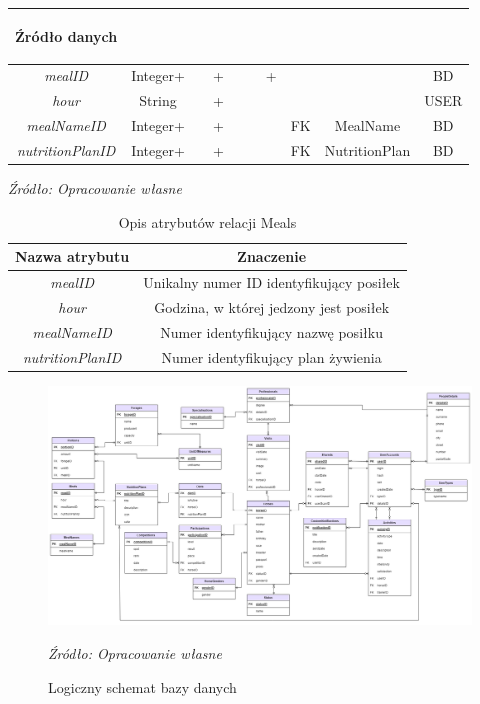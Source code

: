 \documentclass[12pt,twoside]{report}
\begin{document}
\begin{enumerate}[start=10,label={\bfseries REL\textbackslash\arabic*}]
\begin{table}[H]
\begin{tabular}{|c|c|c|c|c|c|c|c|c|c|}
			\begin{sideways}Źródło danych\end{sideways}\\
			\hline
			\textit{mealID}&Integer+&&+&&&+&&&BD\\	
			\hline
			\textit{hour}&String&&+&&&&&&USER\\	
			\hline			
			\textit{mealNameID}&Integer+&&+&&&&FK&MealName&BD\\	
			\hline			
			\textit{nutritionPlanID}&Integer+&&+&&&&FK&NutritionPlan&BD\\	
			\hline
		\end{tabular}
	\end{table}
	
	\begin{table}[H]
		\caption{Opis atrybutów relacji Meals}
		\textit{Źródło: Opracowanie własne}
		$\ $
		\label{MealsAttributeDescription}
		\centering
		\begin{tabular}{|c|c|}
			\hline
			Nazwa atrybutu & Znaczenie \\
			\hline
			\textit{mealID}&Unikalny numer ID identyfikujący posiłek\\	
			\hline
			\textit{hour}&Godzina, w której jedzony jest posiłek\\	
			\hline			
			\textit{mealNameID}&Numer identyfikujący nazwę posiłku\\	
			\hline			
			\textit{nutritionPlanID}&Numer identyfikujący plan żywienia\\	
			\hline
		\end{tabular}
	\end{table}
\end{enumerate}
\begin{figure}[H]
	\centering
	\includegraphics[scale=0.35, angle=-90]{DiagramLogiczny}
	\caption{Logiczny schemat bazy danych}
	\textit{Źródło: Opracowanie własne}
	\label{DiagramLogiczny}
\end{figure}
\newpage
\end{document}
